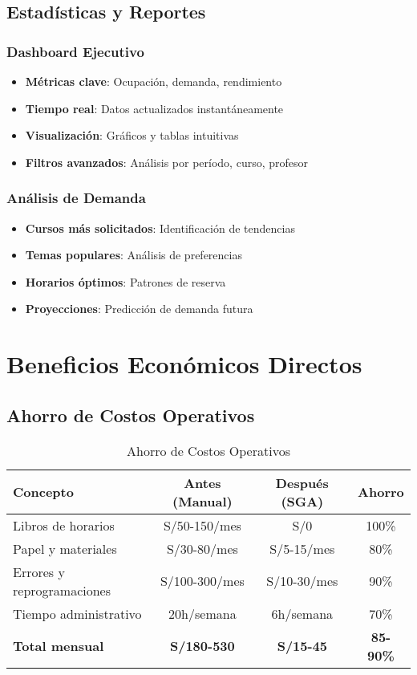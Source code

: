 \documentclass[12pt,a4paper]{article}
\begin{document}
\subsection{Estadísticas y Reportes}

\subsubsection{Dashboard Ejecutivo}
\begin{itemize}
    \item \textbf{Métricas clave}: Ocupación, demanda, rendimiento
    \item \textbf{Tiempo real}: Datos actualizados instantáneamente
    \item \textbf{Visualización}: Gráficos y tablas intuitivas
    \item \textbf{Filtros avanzados}: Análisis por período, curso, profesor
\end{itemize}

\subsubsection{Análisis de Demanda}
\begin{itemize}
    \item \textbf{Cursos más solicitados}: Identificación de tendencias
    \item \textbf{Temas populares}: Análisis de preferencias
    \item \textbf{Horarios óptimos}: Patrones de reserva
    \item \textbf{Proyecciones}: Predicción de demanda futura
\end{itemize}

\section{Beneficios Económicos Directos}

\subsection{Ahorro de Costos Operativos}

\begin{table}[H]
\centering
\begin{tabular}{|l|c|c|c|}
\hline
\textbf{Concepto} & \textbf{Antes (Manual)} & \textbf{Después (SGA)} & \textbf{Ahorro} \\
\hline
Libros de horarios & S/50-150/mes & S/0 & 100\% \\
Papel y materiales & S/30-80/mes & S/5-15/mes & 80\% \\
Errores y reprogramaciones & S/100-300/mes & S/10-30/mes & 90\% \\
Tiempo administrativo & 20h/semana & 6h/semana & 70\% \\
\hline
\textbf{Total mensual} & \textbf{S/180-530} & \textbf{S/15-45} & \textbf{85-90\%} \\
\hline
\end{tabular}
\caption{Ahorro de Costos Operativos}
\end{table}
\end{document}
